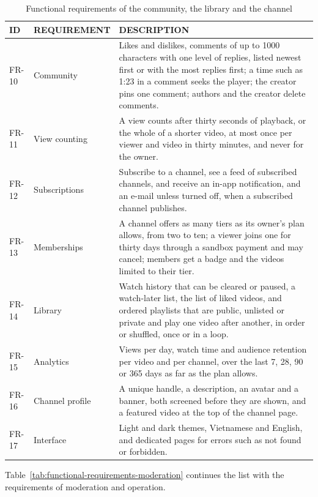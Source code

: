\begin{table}[H]
\centering
\caption{Functional requirements of the community, the library and the channel}
\label{tab:functional-requirements-community}
\small
\begin{tabularx}{\textwidth}{p{} p{} X}
\toprule
\textbf{ID} & \textbf{REQUIREMENT} & \textbf{DESCRIPTION} \\
\midrule
FR-10 & Community & Likes and dislikes, comments of up to 1000 characters with one level of replies, listed newest first or with the most replies first; a time such as 1:23 in a comment seeks the player; the creator pins one comment; authors and the creator delete comments. \\
FR-11 & View counting & A view counts after thirty seconds of playback, or the whole of a shorter video, at most once per viewer and video in thirty minutes, and never for the owner. \\
FR-12 & Subscriptions & Subscribe to a channel, see a feed of subscribed channels, and receive an in-app notification, and an e-mail unless turned off, when a subscribed channel publishes. \\
FR-13 & Memberships & A channel offers as many tiers as its owner's plan allows, from two to ten; a viewer joins one for thirty days through a sandbox payment and may cancel; members get a badge and the videos limited to their tier. \\
FR-14 & Library & Watch history that can be cleared or paused, a watch-later list, the list of liked videos, and ordered playlists that are public, unlisted or private and play one video after another, in order or shuffled, once or in a loop. \\
FR-15 & Analytics & Views per day, watch time and audience retention per video and per channel, over the last 7, 28, 90 or 365 days as far as the plan allows. \\
FR-16 & Channel profile & A unique handle, a description, an avatar and a banner, both screened before they are shown, and a featured video at the top of the channel page. \\
FR-17 & Interface & Light and dark themes, Vietnamese and English, and dedicated pages for errors such as not found or forbidden. \\
\bottomrule
\end{tabularx}
\end{table}

Table~\ref{tab:functional-requirements-moderation} continues the list with the requirements of
moderation and operation.

